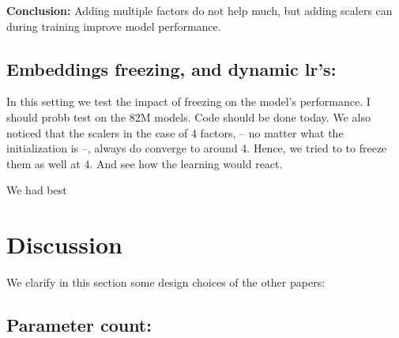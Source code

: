 \documentclass{article}
\begin{document}
{\begin{table}[h]
\end{table}

\textbf{Conclusion:} Adding multiple factors do not help much, but adding scalers can during training improve model performance.

\subsection{Embeddings freezing, and dynamic lr's:}%
\label{sub:Embeddings freezing:}

In this setting we test the impact of freezing on the model's performance. I should probb test on the 82M models. Code should be done today. We also noticed that the scalers in the case of 4 factors, -- no matter what the initialization is --, always do converge to around 4. Hence, we tried to to freeze them as well at 4. And see how the learning would react.

We had best 


\begin{comment}
\subsection{General trends:}%

Things to add here:

\begin{itemize}
	\item Models do not get better at Wiki, but do improve on Lambada.
	\item Distillation is not helpful 
	\item Does pruning help? For training and for inference?
	\item does re-plugging the matrix work? 
\end{itemize}
\end{comment}

\section{Discussion}%
\label{sec:Discussion}

We clarify in this section some design choices of the other papers:

\subsection{Parameter count:}%
\label{sub:Parameter count:}

}
\end{document}
